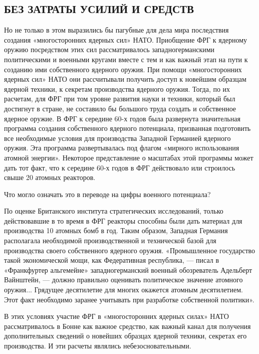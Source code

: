 \documentclass[12pt, a4paper, openany]{book}
\begin{document}
	
		\subsection[Без затраты усилий и средств]{\center БЕЗ ЗАТРАТЫ УСИЛИЙ И СРЕДСТВ}

	
	Но не только в этом выразились бы пагубные для дела мира последствия создания «многосторонних ядерных сил» НАТО. Приобщение ФРГ к ядерному оружию посредством этих сил рассматривалось западногерманскими политическими и военными кругами вместе с тем и как важный этап на пути к созданию ими собственного ядерного оружия. При помощи «многосторонних ядерных сил» НАТО они рассчитывали получить доступ к новейшим образцам ядерной техники, к секретам производства ядерного оружия. Тогда, по их расчетам, для ФРГ при том уровне развития науки и техники, который был достигнут в стране, не составило бы большого труда создать и собственное ядерное оружие. В ФРГ к середине 60-х годов была развернута значительная программа создания собственного ядерного потенциала, призванная подготовить все необходимые условия для производства Западной Германией ядерного оружия. Эта программа развертывалась под флагом «мирного использования атомной энергии». Некоторое представление о масштабах этой программы может дать тот факт, что к середине 60-х годов в ФРГ действовало или строилось свыше 20 атомных реакторов.
	
	Что могло означать это в переводе на цифры военного потенциала?
	
	По оценке Британского института стратегических исследований, только действовавшие в то время в ФРГ реакторы способны были дать материал для производства 10 атомных бомб в год. Таким образом, Западная Германия располагала необходимой производственной и технической базой для производства своего собственного ядерного оружия. «Промышленное государство такой экономической мощи, как Федеративная республика, — писал в «Франкфуртер альгемейне» западногерманский военный обозреватель Адельберт Вайнштейн, — должно правильно оценивать политическое значение атомного оружия... Грядущее десятилетие для многих окажется атомным десятилетием. Этот факт необходимо заранее учитывать при разработке собственной политики».
	
	
	
	В этих условиях участие ФРГ в «многосторонних ядерных силах» НАТО рассматривалось в Бонне как важное средство, как важный канал для получения дополнительных сведений о новейших образцах ядерной техники, секретах его производства. И эти расчеты являлись небезосновательными.
	
\end{document}

